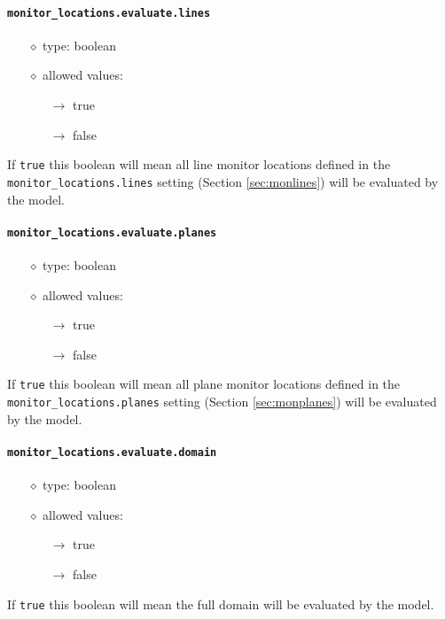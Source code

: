 \documentclass[]{article}
\def\code#1{\texttt{#1}}
\begin{document}
\paragraph{\code{monitor\_locations.evaluate.lines}}
\begin{itemize}
    \item[$\diamond$] type: boolean
    \item[$\diamond$] allowed values:
    \begin{itemize}
        \item[$\rightarrow$] true
        \item[$\rightarrow$] false
    \end{itemize}
\end{itemize}
If \code{true} this boolean will mean all line monitor locations defined in the
\code{monitor\_locations.lines} setting (Section \ref{sec:monlines}) will be
evaluated by the model.

\paragraph{\code{monitor\_locations.evaluate.planes}}
\begin{itemize}
    \item[$\diamond$] type: boolean
    \item[$\diamond$] allowed values:
    \begin{itemize}
        \item[$\rightarrow$] true
        \item[$\rightarrow$] false
    \end{itemize}
\end{itemize}
If \code{true} this boolean will mean all plane monitor locations defined in the
\code{monitor\_locations.planes} setting (Section \ref{sec:monplanes}) will be
evaluated by the model.

\paragraph{\code{monitor\_locations.evaluate.domain}}
\begin{itemize}
    \item[$\diamond$] type: boolean
    \item[$\diamond$] allowed values:
    \begin{itemize}
        \item[$\rightarrow$] true
        \item[$\rightarrow$] false
    \end{itemize}
\end{itemize}
If \code{true} this boolean will mean the full domain  will be evaluated by the
model. 
\end{document}
